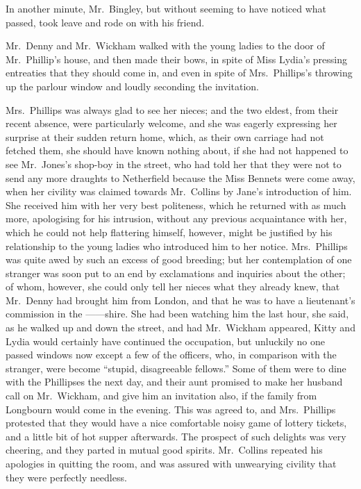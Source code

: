 \documentclass[12pt,english,oneside]{book}
\begin{document}
In another minute, Mr.\ Bingley, but without seeming to have noticed
what passed, took leave and rode on with his friend.

Mr.\ Denny and Mr.\ Wickham walked with the young ladies to the
door of Mr.\ Phillip's house, and then made their bows, in spite
of Miss Lydia's pressing entreaties that they should come in, and
even in spite of Mrs.\ Phillips's throwing up the parlour window
and loudly seconding the invitation.

Mrs.\ Phillips was always glad to see her nieces; and the two eldest,
from their recent absence, were particularly welcome, and she was
eagerly expressing her surprise at their sudden return home, which,
as their own carriage had not fetched them, she should have known
nothing about, if she had not happened to see Mr.\ Jones's shop-boy
in the street, who had told her that they were not to send any more
draughts to Netherfield because the Miss Bennets were come away, when
her civility was claimed towards Mr.\ Collins by Jane's introduction
of him. She received him with her very best politeness, which he returned
with as much more, apologising for his intrusion, without any previous
acquaintance with her, which he could not help flattering himself,
however, might be justified by his relationship to the young ladies
who introduced him to her notice. Mrs.\ Phillips was quite awed by
such an excess of good breeding; but her contemplation of one stranger
was soon put to an end by exclamations and inquiries about the other;
of whom, however, she could only tell her nieces what they already
knew, that Mr.\ Denny had brought him from London, and that he was
to have a lieutenant's commission in the \mbox{------shire.} She
had been watching him the last hour, she said, as he walked up and
down the street, and had Mr.\ Wickham appeared, Kitty and Lydia would
certainly have continued the occupation, but unluckily no one passed
windows now except a few of the officers, who, in comparison with
the stranger, were become {}``stupid, disagreeable fellows.'' Some
of them were to dine with the Phillipses the next day, and their aunt
promised to make her husband call on Mr.\ Wickham, and give him an
invitation also, if the family from Longbourn would come in the evening.
This was agreed to, and Mrs.\ Phillips protested that they would
have a nice comfortable noisy game of lottery tickets, and a little
bit of hot supper afterwards. The prospect of such delights was very
cheering, and they parted in mutual good spirits. Mr.\ Collins repeated
his apologies in quitting the room, and was assured with unwearying
civility that they were perfectly needless.
\end{document}
